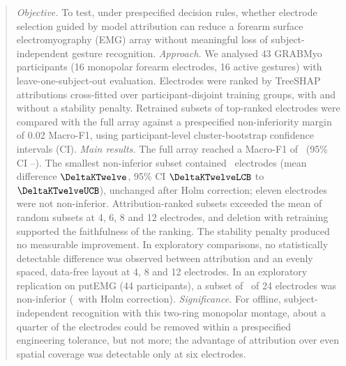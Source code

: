 \documentclass{iopjournal}
\begin{document}
\begin{abstract}
\textit{Objective.} To test, under prespecified decision rules, whether electrode selection guided by model attribution can reduce a forearm surface electromyography (EMG) array without meaningful loss of subject-independent gesture recognition.
\textit{Approach.} We analysed 43 GRABMyo participants (16 monopolar forearm electrodes, 16 active gestures) with leave-one-subject-out evaluation. Electrodes were ranked by TreeSHAP attributions cross-fitted over participant-disjoint training groups, with and without a stability penalty. Retrained subsets of top-ranked electrodes were compared with the full array against a prespecified non-inferiority margin of 0.02 Macro-F1, using participant-level cluster-bootstrap confidence intervals (CI).
\textit{Main results.} The full array reached a Macro-F1 of \FullXGB\ (95\% CI \FullXGBLCB--\FullXGBUCB). The smallest non-inferior subset contained \KStar\ electrodes (mean difference $\DeltaKTwelve$, 95\% CI $\DeltaKTwelveLCB$ to $\DeltaKTwelveUCB$), unchanged after Holm correction; eleven electrodes were not non-inferior. Attribution-ranked subsets exceeded the mean of random subsets at 4, 6, 8 and 12 electrodes, and deletion with retraining supported the faithfulness of the ranking. The stability penalty produced no measurable improvement. In exploratory comparisons, no statistically detectable difference was observed between attribution and an evenly spaced, data-free layout at 4, 8 and 12 electrodes. In an exploratory replication on putEMG (44 participants), a subset of \PutKStarPtTwo\ of 24 electrodes was non-inferior (\PutKStarHolmPtTwo\ with Holm correction).
\textit{Significance.} For offline, subject-independent recognition with this two-ring monopolar montage, about a quarter of the electrodes could be removed within a prespecified engineering tolerance, but not more; the advantage of attribution over even spatial coverage was detectable only at six electrodes.
\end{abstract}









\end{document}
